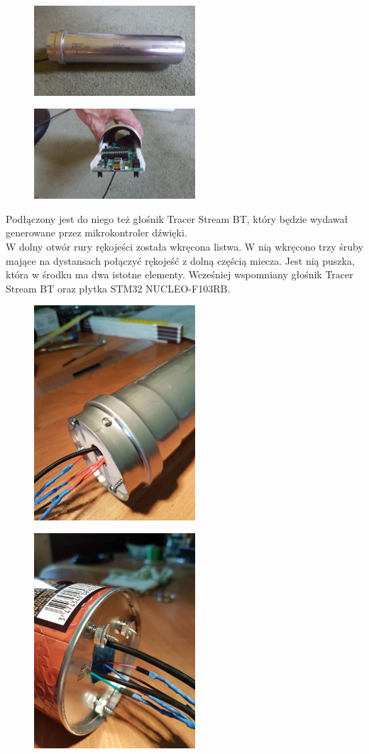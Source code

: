 \documentclass[10pt, a4paper]{article}
\begin{document}
\begin{figure}[H]
	\centering
	\includegraphics[width=60mm]{4.jpg}
	\end{figure}
	\begin{figure}[H]
	\centering
	\includegraphics[width=60mm]{6.jpg}
	\end{figure}
Podłączony jest do niego też głośnik Tracer Stream BT, który będzie wydawał generowane przez mikrokontroler dźwięki.\\
W dolny otwór rury rękojeści została wkręcona listwa. W nią wkręcono trzy śruby mające na dystansach połączyć rękojeść z dolną częścią miecza. Jest nią puszka, która w środku ma dwa istotne elementy. Wcześniej wspomniany głośnik Tracer Stream BT oraz płytka STM32 NUCLEO-F103RB.\\ 
	\begin{figure}[H]
	\centering
	\includegraphics[width=60mm]{13.jpg}
	\end{figure}
		\begin{figure}[H]
	\centering
	\includegraphics[width=60mm]{19.jpg}
	\end{figure}
\end{document}
